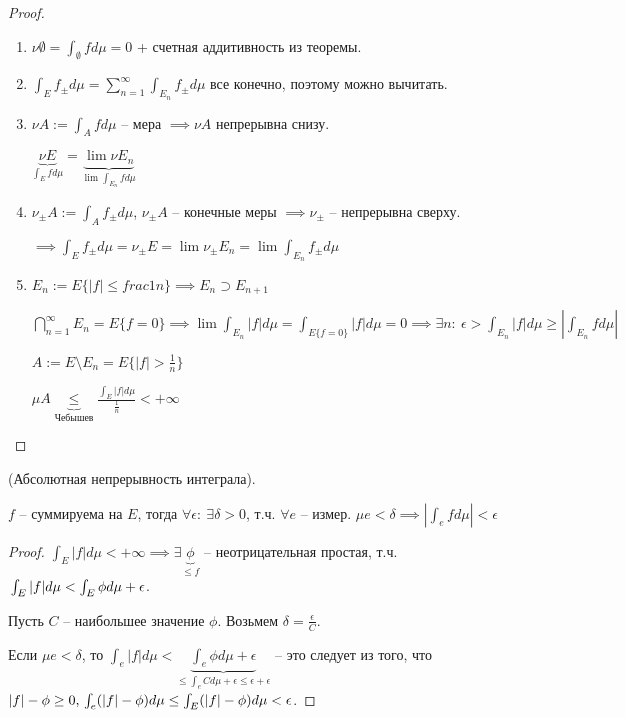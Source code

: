 \begin{proof}
    \begin{enumerate}
        \item $\nu \emptyset = \int_{\emptyset}{f d \mu} = 0$ + счетная аддитивность из теоремы.
        \item $\int_{E}{f_{\pm} d \mu} = \sum_{n=1}^{\infty} \int_{E_n}{f_{\pm} d \mu}$ все конечно, поэтому можно вычитать.
        \item {
            $\nu A := \int_A{f d \mu}$ -- мера $\implies \nu A$ непрерывна снизу.

            $\underbrace{\nu E}_{\int_E{f d \mu}} = \underbrace{\lim {\nu E_n}}_{\lim{\int_{E_n}{f d \mu}}}$
        }
        \item {
            $\nu_{\pm} A := \int_{A}{f_{\pm} d \mu}$, $\nu_{\pm} A$ -- конечные меры $\implies \nu_{\pm}$ -- непрерывна сверху.

            $\implies \int_E{f_{\pm} d \mu} = \nu_{\pm}E = \lim \nu_{\pm} E_n = \lim{\int_{E_n}{f_{\pm} d \mu}}$
        }
        \item {
            $E_n := E \{ |f| \leq frac{1}{n} \} \implies E_n \supset E_{n+1}$

            $\bigcap_{n=1}^{\infty}E_n = E\{ f = 0 \} \implies \lim{\int_{E_n}{|f| d \mu}} = \int_{E\{ f = 0 \}}{|f| d \mu} = 0 \implies \exists n: \ \epsilon > \int_{E_n}{|f| d \mu} \geq \left| \int_{E_n}{f d \mu} \right|$

            $A := E \setminus E_n = E \{ |f| > \frac{1}{n} \}$

            $\mu A \underbrace{\leq}_{\text{Чебышев}} \frac{\int_E{|f|d \mu}}{\frac{1}{n}} < +\infty$
        }
    \end{enumerate}
\end{proof}

\begin{theorem}
    (Абсолютная непрерывность интеграла).

    $f$ -- суммируема на $E$, тогда $\forall \epsilon: \ \exists \delta > 0$, т.ч. $\forall e $ -- измер. $\mu e < \delta \implies | \int_e f d \mu | < \epsilon$
\end{theorem}
\begin{proof}
    $\int_E |f| d \mu < +\infty \implies \exists \underbrace{\phi}_{\leq f}$ -- неотрицательная простая, т.ч. $\\ \int_E |f| d \mu < \int_E \phi d \mu + \epsilon$.

    Пусть $C$ -- наибольшее значение $\phi$. Возьмем $\delta = \frac{\epsilon}{C}$.

    Если $\mu e < \delta$, то $\int_e |f| d \mu < \underbrace{\int_e \phi d \mu + \epsilon}_{\leq \int_e C d \mu + \epsilon \leq \epsilon + \epsilon}$ -- это следует из того, что $|f| - \phi \geq 0, \\ \int_{e} (|f| - \phi) d \mu \leq \int_E (|f| - \phi) d \mu < \epsilon$.
\end{proof}

